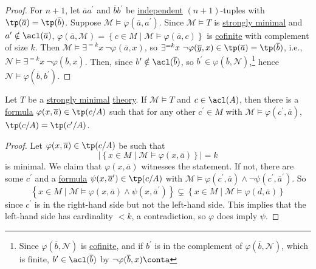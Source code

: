 \begin{proof}
	For \(n + 1\), let \(\overline{a} a^{\prime} \) and \(\overline{b} b^{\prime} \) be \hyperref[def:independent]{independent} \((n+1)\)-tuples with \(\tp(\overline{a} ) = \tp(\overline{b} )\). Suppose \(\mathcal{M} \models \varphi (\overline{a}, a^{\prime} )\). Since \(\mathcal{M} \models T\) is \hyperref[def:strongly-minimal]{strongly minimal} and \(a^{\prime} \notin\acl(\overline{a} )\), \(\varphi (\overline{a} , \mathcal{M} ) = \left\{ c\in M \mid \mathcal{M} \models \varphi (\overline{a} , c) \right\} \) is \hyperref[def:cofinite]{cofinite} with complement of size \(k\). Then \(\mathcal{M} \models \exists ^{=k}x\ \lnot \varphi (\overline{a} , x)\), so \(\exists ^{=k}x\ \lnot \varphi (\overline{y} , x) \in \tp(\overline{a} ) = \tp(\overline{b} )\), i.e., \(\mathcal{N} \models \exists ^{=k}x\ \lnot \varphi(\overline{b} , x) \). Then, since \(b^{\prime} \notin \acl(\overline{b} )\), so \(b^{\prime} \in \varphi (\overline{b} , \mathcal{N} )\),\footnote{Since \(\varphi (\overline{b} , \mathcal{N} )\) is \hyperref[def:cofinite]{cofinite}, and if \(b^{\prime} \) is in the complement of \(\varphi (\overline{b} , \mathcal{N} )\), which is finite, \(b^{\prime} \in \acl(\overline{b} )\) by \(\lnot \varphi (\overline{b} , x) \conta\)} hence \(\mathcal{N} \models \varphi (\overline{b} , b^{\prime} )\).
\end{proof}

\begin{lemma}\label{lma:lec19}
	Let \(T\) be a \hyperref[def:strongly-minimal]{strongly minimal} \hyperref[def:theory]{theory}. If \(\mathcal{M} \models T\) and \(c\in \acl(A)\), then there is a \hyperref[def:formula]{formula} \(\varphi (x, \overline{a} ) \in \tp(c / A)\) such that for any other \(c^{\prime} \in M\) with \(\mathcal{M} \models \varphi (c^{\prime} , \overline{a} )\), \(\tp(c / A) = \tp(c^{\prime} / A)\).
\end{lemma}
\begin{proof}
	Let \(\varphi (x, \overline{a} )\in \tp(c / A)\) be such that
	\[
		\vert \left\{ x\in M \mid \mathcal{M} \models \varphi (x, \overline{a} ) \right\}  \vert = k
	\]
	is minimal. We claim that \(\varphi (x, \overline{a} )\) witnesses the statement. If not, there are some \(c^{\prime} \) and a \hyperref[def:formula]{formula} \(\psi (x, \overline{a} ^{\prime} )\in \tp(c / A)\) with \(\mathcal{M} \models \varphi (c^{\prime} , \overline{a} ) \land \lnot \psi (c^{\prime} , \overline{a} ^{\prime} )\). So
	\[
		\left\{ x\in M \mid \mathcal{M} \models \varphi (x, \overline{a} ) \land \psi (x, \overline{a} ^{\prime} ) \right\}
		\subsetneq \left\{ x \in M \mid \mathcal{M} \models \varphi (d, \overline{a} ) \right\}
	\]
	since \(c^{\prime} \) is in the right-hand side but not the left-hand side. This implies that the left-hand side has cardinality \(< k\), a contradiction, so \(\varphi \) does imply \(\psi \).
\end{proof}

